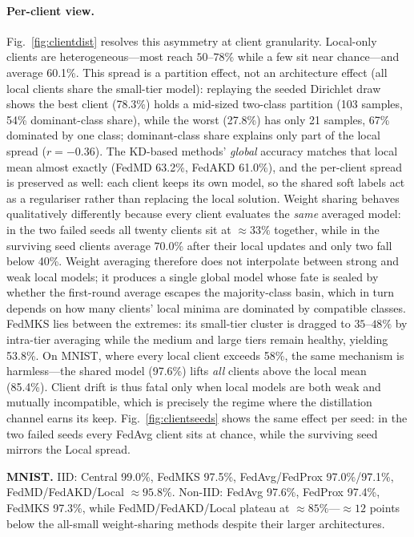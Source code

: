 \documentclass[conference]{IEEEtran}
\begin{document}
\paragraph{Per-client view.}
Fig.~\ref{fig:clientdist} resolves this asymmetry at client granularity.
Local-only clients are heterogeneous---most reach $50$--$78\%$ while a
few sit near chance---and average 60.1\%.  This spread is a partition
effect, not an architecture effect (all local clients share the
small-tier model): replaying the seeded Dirichlet draw shows the best
client (78.3\%) holds a mid-sized two-class partition (103 samples, 54\%
dominant-class share), while the worst (27.8\%) has only 21 samples,
67\% dominated by one class; dominant-class share explains only part
of the local spread ($r{=}{-}0.36$).  The KD-based methods'
\emph{global} accuracy matches that local mean almost exactly (FedMD
63.2\%, FedAKD 61.0\%), and the per-client spread is preserved as well:
each client keeps its own model, so the shared soft labels act as a
regulariser rather than replacing the local solution.  Weight sharing behaves
qualitatively differently because every client evaluates the \emph{same}
averaged model: in the two failed seeds all twenty clients sit at
${\approx}33\%$ together, while in the surviving seed clients average
70.0\% after their local updates and only two fall below 40\%.  Weight averaging
therefore does not interpolate between strong and weak local models; it
produces a single global model whose fate is sealed by whether the
first-round average escapes the majority-class basin, which in turn
depends on how many clients' local minima are dominated by compatible
classes.  FedMKS lies between the extremes: its small-tier cluster is
dragged to $35$--$48\%$ by intra-tier averaging while the medium and
large tiers remain healthy, yielding 53.8\%.  On MNIST, where every
local client exceeds 58\%, the same mechanism is harmless---the shared
model (97.6\%) lifts \emph{all} clients above the local mean (85.4\%).
Client drift is thus fatal only when local models are both weak and
mutually incompatible, which is precisely the regime where the
distillation channel earns its keep.
Fig.~\ref{fig:clientseeds} shows the same effect per seed: in the two
failed seeds every FedAvg client sits at chance, while the surviving
seed mirrors the Local spread.

\textbf{MNIST.}
IID: Central 99.0\%, FedMKS 97.5\%, FedAvg/FedProx 97.0\%/97.1\%,
FedMD/FedAKD/Local ${\approx}95.8\%$.  Non-IID: FedAvg 97.6\%, FedProx
97.4\%, FedMKS 97.3\%, while FedMD/FedAKD/Local plateau at
${\approx}85\%$---${\approx}12$ points below the all-small weight-sharing
methods despite their larger architectures.
\end{document}
